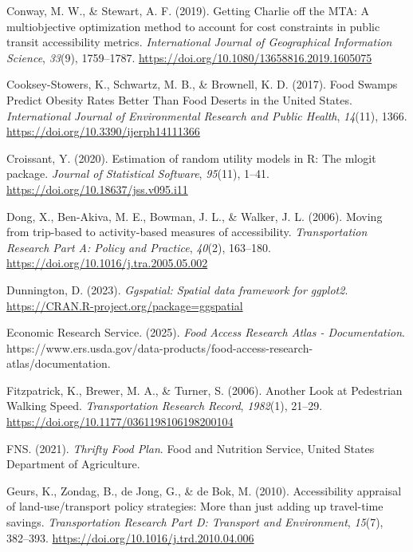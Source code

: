 \documentclass[
  letterpaper,
  number,
  review,
  3p]{elsarticle}
\newlength{\cslhangindent}
\newenvironment{CSLReferences}[2] %
 {\begin{list}{}{%
  \setlength{\itemindent}{0pt}
  \setlength{\leftmargin}{0pt}
  \setlength{\parsep}{0pt}
  \ifodd #1
   \setlength{\leftmargin}{\cslhangindent}
   \setlength{\itemindent}{-1\cslhangindent}
  \fi
  \setlength{\itemsep}{#2\baselineskip}}}
 {\end{list}}
\begin{document}
\begin{CSLReferences}{1}{0}
Conway, M. W., \& Stewart, A. F. (2019). Getting {Charlie} off the
{MTA}: A multiobjective optimization method to account for cost
constraints in public transit accessibility metrics. \emph{International
Journal of Geographical Information Science}, \emph{33}(9), 1759--1787.
\url{https://doi.org/10.1080/13658816.2019.1605075}

Cooksey-Stowers, K., Schwartz, M. B., \& Brownell, K. D. (2017). Food
{Swamps Predict Obesity Rates Better Than Food Deserts} in the {United
States}. \emph{International Journal of Environmental Research and
Public Health}, \emph{14}(11), 1366.
\url{https://doi.org/10.3390/ijerph14111366}

Croissant, Y. (2020). Estimation of random utility models in {R}: The
{mlogit} package. \emph{Journal of Statistical Software}, \emph{95}(11),
1--41. \url{https://doi.org/10.18637/jss.v095.i11}

Dong, X., Ben-Akiva, M. E., Bowman, J. L., \& Walker, J. L. (2006).
Moving from trip-based to activity-based measures of accessibility.
\emph{Transportation Research Part A: Policy and Practice},
\emph{40}(2), 163--180. \url{https://doi.org/10.1016/j.tra.2005.05.002}

Dunnington, D. (2023). \emph{Ggspatial: Spatial data framework for
ggplot2}. \url{https://CRAN.R-project.org/package=ggspatial}

Economic Research Service. (2025). \emph{Food {Access Research Atlas} -
{Documentation}}.
https://www.ers.usda.gov/data-products/food-access-research-atlas/documentation.

Fitzpatrick, K., Brewer, M. A., \& Turner, S. (2006). Another {Look} at
{Pedestrian Walking Speed}. \emph{Transportation Research Record},
\emph{1982}(1), 21--29.
\url{https://doi.org/10.1177/0361198106198200104}

FNS. (2021). \emph{Thrifty {Food Plan}}. {Food and Nutrition Service,
United States Department of Agriculture}.

Geurs, K., Zondag, B., de Jong, G., \& de Bok, M. (2010). Accessibility
appraisal of land-use/transport policy strategies: {More} than just
adding up travel-time savings. \emph{Transportation Research Part D:
Transport and Environment}, \emph{15}(7), 382--393.
\url{https://doi.org/10.1016/j.trd.2010.04.006}


\end{CSLReferences}
\end{document}
